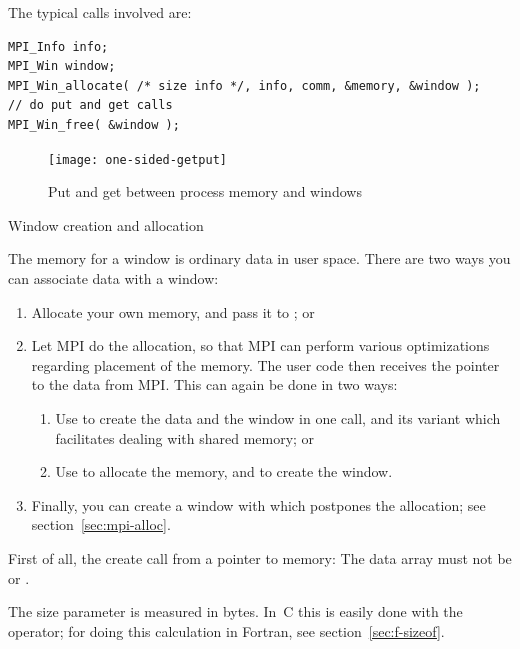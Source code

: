 
The typical calls involved are:
\lstset{style=reviewcode,language=C}
\begin{lstlisting}
MPI_Info info;
MPI_Win window;
MPI_Win_allocate( /* size info */, info, comm, &memory, &window );
// do put and get calls
MPI_Win_free( &window );
\end{lstlisting}

\begin{figure}[ht]
  \texttt{[image: one-sided-getput]}
  \caption{Put and get between process memory and windows}
  \label{fig:putget}
\end{figure}

 {Window creation and allocation}
\label{sec:win-alloc}

The memory for a window is ordinary data in user space. There are two
ways you can associate data with a window:
\begin{enumerate}
\item Allocate your own memory, and pass it to
  ; or
\item Let MPI do the allocation, so that MPI can perform various
  optimizations regarding placement of the memory. The user code then
  receives the pointer to the data from MPI. This can again be done in two ways:
  \begin{enumerate}
  \item Use  to create the data and the
    window in one call, and its variant
     which facilitates dealing
    with shared memory; or
  \item Use  to allocate the memory, and
     to create the window.
  \end{enumerate}
\item Finally, you can create a window with
   which postpones the allocation;
  see section~\ref{sec:mpi-alloc}.
\end{enumerate}

First of all, the create call from a pointer to memory:
%
%
The data array must not be  or .

The size parameter is measured in bytes. In~C this is easily done
with the  operator;
for doing this calculation in Fortran, see section~\ref{sec:f-sizeof}.

